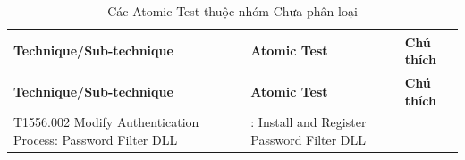 \begingroup
\small
\renewcommand{\arraystretch}{1.12}
\setlength{\LTpre}{0pt}
\setlength{\LTpost}{0pt}
\begin{longtable}{|>{\raggedright\arraybackslash}p{3.2cm}|>{\raggedright\arraybackslash}p{5.5cm}|>{\raggedright\arraybackslash}p{5.8cm}|}
\caption{Các Atomic Test thuộc nhóm Chưa phân loại}\label{tab:chua-phan-loai}\\
\hline
\textbf{Technique/Sub-technique} & \textbf{Atomic Test} & \textbf{Chú thích} \\
\hline
\endfirsthead
\hline
\textbf{Technique/Sub-technique} & \textbf{Atomic Test} & \textbf{Chú thích} \\
\hline
\endhead
\hline
\endfoot
\hline
\endlastfoot
T1556.002 Modify Authentication Process: Password Filter DLL & 1: Install and Register Password Filter DLL &  \\
\hline
\end{longtable}
\endgroup
